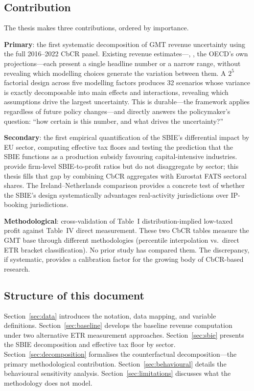 \documentclass[11pt,a4paper]{article}
\begin{document}
\subsection{Contribution}\label{sec:contribution}

The thesis makes three contributions, ordered by importance.

\textbf{Primary}: the first systematic decomposition of GMT revenue uncertainty using the full 2016--2022 CbCR panel. Existing revenue estimates---\citet{barake2022}, \citet{hugger2025}, the OECD's own projections---each present a single headline number or a narrow range, without revealing which modelling choices generate the variation between them. A $2^5$ factorial design across five modelling factors produces 32 scenarios whose variance is exactly decomposable into main effects and interactions, revealing which assumptions drive the largest uncertainty. This is durable---the framework applies regardless of future policy changes---and directly answers the policymaker's question: ``how certain is this number, and what drives the uncertainty?''

\textbf{Secondary}: the first empirical quantification of the SBIE's differential impact by EU sector, computing effective tax floors and testing the \citet{schjelderup2024} prediction that the SBIE functions as a production subsidy favouring capital-intensive industries. \citet{devereux2023} provide firm-level SBIE-to-profit ratios but do not disaggregate by sector; this thesis fills that gap by combining CbCR aggregates with Eurostat FATS sectoral shares. The Ireland--Netherlands comparison provides a concrete test of whether the SBIE's design systematically advantages real-activity jurisdictions over IP-booking jurisdictions.

\textbf{Methodological}: cross-validation of Table~I distribution-implied low-taxed profit against Table~IV direct measurement. These two CbCR tables measure the GMT base through different methodologies (percentile interpolation vs.\ direct ETR bracket classification). No prior study has compared them. The discrepancy, if systematic, provides a calibration factor for the growing body of CbCR-based research.

\subsection{Structure of this document}\label{sec:docstructure}

Section~\ref{sec:data} introduces the notation, data mapping, and variable definitions. Section~\ref{sec:baseline} develops the baseline revenue computation under two alternative ETR measurement approaches. Section~\ref{sec:sbie} presents the SBIE decomposition and effective tax floor by sector. Section~\ref{sec:decomposition} formalises the counterfactual decomposition---the primary methodological contribution. Section~\ref{sec:behavioural} details the behavioural sensitivity analysis. Section~\ref{sec:limitations} discusses what the methodology does not model.
\end{document}
